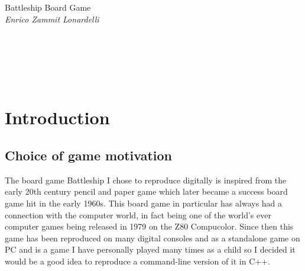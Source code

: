 \documentclass[11pt]{article} %
\begin{document}



\begin{center} %

{\Huge Battleship Board Game}\\[0.5cm] %
\vspace{5mm}
\textit{Enrico Zammit Lonardelli}
\\
\vspace{5mm}
\\
\vspace{5mm}
\\
\vspace{5mm}
\\
\vspace{5mm}
\\
\vspace{5mm}
\\
\end{center}
\vspace{10mm}
\section{Introduction}
\subsection{Choice of game motivation}
The board game Battleship I chose to reproduce digitally is inspired from the early 20th century pencil and paper game which later
became a success board game hit in the early 1960s.
This board game in particular has always had a connection with the computer world, in fact being one of the world's ever
computer games being released in 1979 on the Z80 Compucolor.
Since then this game has been reproduced on many digital consoles and as a standalone game on PC and is a game I have personally played many
times as a child so I decided it would be a good idea to reproduce a command-line version of it in C++.
\end{document}
